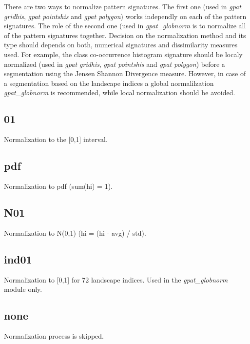 There are two ways to normalize pattern signatures.
The first one (used in {\it gpat gridhis}, {\it gpat pointshis} and {\it gpat polygon}) works independly on each of the pattern signatures.
The role of the second one (used in {\it gpat_globnorm} is to normalize all of the pattern signatures together. 
Decision on the normalization method and its type should depends on both, numerical signatures and dissimilarity measures used.
For example, the class co-occurrence histogram signature should be localy normalized (used in {\it gpat gridhis}, {\it gpat pointshis} and {\it gpat polygon}) before a segmentation using the Jensen Shannon Divergence measure.
However, in case of a segmentation based on the landscape indices a global normalilzation {\it gpat_globnorm} is recommended, while local normalization should be avoided.

\subsection{01}

Normalization to the [0,1] interval.

\subsection{pdf}

Normalization to pdf (sum(hi) = 1).

\subsection{N01}

Normalization to N(0,1) (hi = (hi - avg) / std).

\subsection{ind01}

Normalization to [0,1] for 72 landscape indices.
Used in the {\it gpat\_globnorm} module only.

\subsection{none}

Normalization process is skipped. 